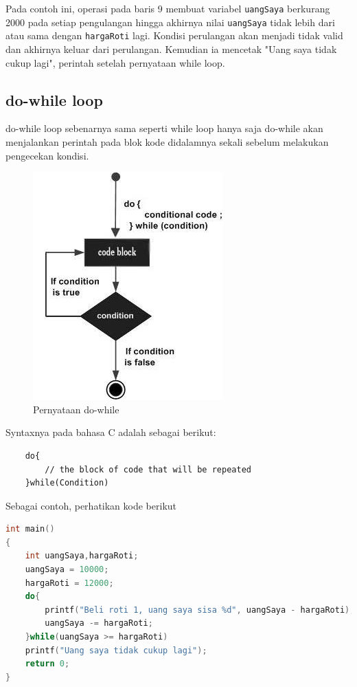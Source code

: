 Pada contoh ini, operasi pada baris 9 membuat variabel \verb|uangSaya| berkurang 2000 pada setiap pengulangan hingga akhirnya nilai \verb|uangSaya| tidak lebih dari atau sama dengan \verb|hargaRoti| lagi.
Kondisi perulangan akan menjadi tidak valid dan akhirnya keluar dari perulangan. Kemudian ia mencetak "Uang saya tidak cukup lagi", perintah setelah pernyataan while loop.

\subsection{do-while loop}
do-while loop sebenarnya sama seperti while loop hanya saja do-while akan menjalankan perintah pada blok kode didalamnya sekali sebelum melakukan pengecekan kondisi.
\begin{figure}[H]
	\centering
	\includegraphics[width=0.4\linewidth]{P2/img/dowhileloop.png}
	\caption{Pernyataan do-while}
	\label{fig:dowhileloop}
\end{figure}
Syntaxnya pada bahasa C adalah sebagai berikut:
\begin{verbatim}
    do{
        // the block of code that will be repeated
    }while(Condition)
\end{verbatim}
Sebagai contoh, perhatikan kode berikut
\begin{lstlisting}[language=c,caption = Contoh Penggunaan do-while,label=lst:dowhileexample01]
int main()
{
	int uangSaya,hargaRoti;
	uangSaya = 10000;
	hargaRoti = 12000;
	do{
	    printf("Beli roti 1, uang saya sisa %d", uangSaya - hargaRoti);
	    uangSaya -= hargaRoti;
	}while(uangSaya >= hargaRoti)
	printf("Uang saya tidak cukup lagi");
	return 0;
}
\end{lstlisting}
